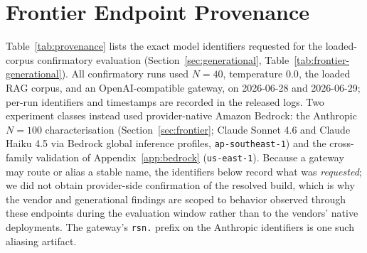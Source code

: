 \documentclass{article}
\begin{document}
\section{Frontier Endpoint Provenance}
\label{app:provenance}

Table~\ref{tab:provenance} lists the exact model identifiers requested for the loaded-corpus confirmatory evaluation (Section~\ref{sec:generational}, Table~\ref{tab:frontier-generational}). All confirmatory runs used $N{=}40$, temperature $0.0$, the loaded RAG corpus, and an OpenAI-compatible gateway, on 2026-06-28 and 2026-06-29; per-run identifiers and timestamps are recorded in the released logs. Two experiment classes instead used provider-native Amazon Bedrock: the Anthropic $N{=}100$ characterisation (Section~\ref{sec:frontier}; Claude Sonnet 4.6 and Claude Haiku 4.5 via Bedrock global inference profiles, \texttt{ap-southeast-1}) and the cross-family validation of Appendix~\ref{app:bedrock} (\texttt{us-east-1}). Because a gateway may route or alias a stable name, the identifiers below record what was \emph{requested}; we did not obtain provider-side confirmation of the resolved build, which is why the vendor and generational findings are scoped to behavior observed through these endpoints during the evaluation window rather than to the vendors' native deployments. The gateway's \texttt{rsn.} prefix on the Anthropic identifiers is one such aliasing artifact.
\end{document}
